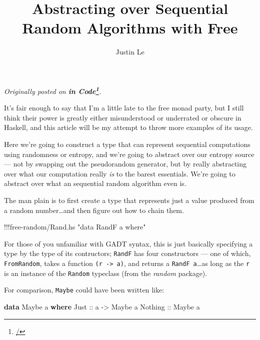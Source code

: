 \documentclass[]{article}
\title{Abstracting over Sequential Random Algorithms with Free}
\author{Justin Le}
\newenvironment{Shaded}{}{}
\newcommand{\KeywordTok}[1]{\textcolor[rgb]{0.00,0.44,0.13}{\textbf{{#1}}}}
\newcommand{\DataTypeTok}[1]{\textcolor[rgb]{0.56,0.13,0.00}{{#1}}}
\newcommand{\StringTok}[1]{\textcolor[rgb]{0.25,0.44,0.63}{{#1}}}
\newcommand{\OtherTok}[1]{\textcolor[rgb]{0.00,0.44,0.13}{{#1}}}
\newcommand{\FunctionTok}[1]{\textcolor[rgb]{0.02,0.16,0.49}{{#1}}}
\newcommand{\NormalTok}[1]{{#1}}
\renewcommand{\href}[2]{#2\footnote{\url{#1}}}
\begin{document}
\maketitle

\emph{Originally posted on \textbf{\href{/}{in Code}}.}

It's fair enough to say that I'm a little late to the free monad party,
but I still think their power is greatly either misunderstood or
underrated or obscure in Haskell, and this article will be my attempt to
throw more examples of its usage.

Here we're going to construct a type that can represent sequential
computations using randomness or entropy, and we're going to abstract
over our entropy source --- not by swapping out the pseudorandom
generator, but by really abstracting over what our computation really
\emph{is} to the barest essentials. We're going to abstract over what an
sequential random algorithm even is.

The man plain is to first create a type that represents just a value
produced from a random number\ldots{}and then figure out how to chain
them.

\begin{Shaded}
\begin{Highlighting}[]
\FunctionTok{!!!}\NormalTok{free}\FunctionTok{-}\NormalTok{random}\FunctionTok{/}\NormalTok{Rand.hs }\StringTok{"data RandF a where"}
\end{Highlighting}
\end{Shaded}

For those of you unfamiliar with GADT syntax, this is just basically
specifying a type by the type of its contructors; \texttt{RandF} has
four constructors --- one of which, \texttt{FromRandom}, takes a
function \texttt{(r\ -\textgreater{}\ a)}, and returns a
\texttt{RandF\ a}\ldots{}as long as the \texttt{r} is an instance of the
\texttt{Random} typeclass (from the \emph{random} package).

For comparison, \texttt{Maybe} could have been written like:

\begin{Shaded}
\begin{Highlighting}[]
\KeywordTok{data} \DataTypeTok{Maybe} \NormalTok{a }\KeywordTok{where}
    \DataTypeTok{Just}\OtherTok{    ::} \NormalTok{a }\OtherTok{->} \DataTypeTok{Maybe} \NormalTok{a}
    \DataTypeTok{Nothing}\OtherTok{ ::} \DataTypeTok{Maybe} \NormalTok{a}
\end{Highlighting}
\end{Shaded}
\end{document}
